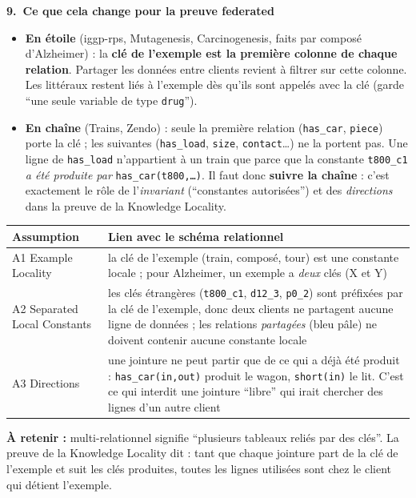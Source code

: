 \documentclass[10pt]{article}
\newcommand{\titrebox}[2]{\needspace{10\baselineskip}\vspace{8pt}
  \begin{tcolorbox}[colback=marine, colframe=marine, arc=0pt, boxrule=0pt,
    top=4pt, bottom=4pt, left=8pt]
  \color{white}\Large\bfseries #1.~#2
  \end{tcolorbox}\vspace{2pt}}
\newcommand{\ce}[1]{\begin{pourquoi}\textbf{\textcolor{marine}{À retenir :}} #1\end{pourquoi}}
\newcommand{\st}[1]{\par\needspace{7\baselineskip}\vspace{5pt}{\normalsize\bfseries\textcolor{marine}{#1}}\par\vspace{2pt}}
\begin{document}
\titrebox{9}{Ce que cela change pour la preuve federated}
\st{Deux formes de schéma : en étoile ou en chaîne}
\begin{itemize}
  \item \textbf{En étoile} (iggp-rps, Mutagenesis, Carcinogenesis, faits par composé d'Alzheimer) : la \textbf{clé de l'exemple est la première colonne de chaque relation}. Partager les données entre clients revient à filtrer sur cette colonne. Les littéraux restent liés à l'exemple dès qu'ils sont appelés avec la clé (garde ``une seule variable de type \texttt{drug}'').
  \item \textbf{En chaîne} (Trains, Zendo) : seule la première relation (\texttt{has\_car}, \texttt{piece}) porte la clé ; les suivantes (\texttt{has\_load}, \texttt{size}, \texttt{contact}\ldots) ne la portent pas. Une ligne de \texttt{has\_load} n'appartient à un train que parce que la constante \texttt{t800\_c1} \emph{a été produite par} \texttt{has\_car(t800,\ldots)}. Il faut donc \textbf{suivre la chaîne} : c'est exactement le rôle de l'\emph{invariant} (``constantes autorisées'') et des \emph{directions} dans la preuve de la Knowledge Locality.
\end{itemize}
\st{Où chaque hypothèse intervient}
\renewcommand{\arraystretch}{1.3}
\begin{tabular}{@{}L{3.2cm}L{13.2cm}@{}}
\textbf{Assumption} & \textbf{Lien avec le schéma relationnel}\\\hline
A1 Example Locality & la clé de l'exemple (train, composé, tour) est une constante locale ; pour Alzheimer, un exemple a \emph{deux} clés (X et Y)\\
A2 Separated Local Constants & les clés étrangères (\texttt{t800\_c1}, \texttt{d12\_3}, \texttt{p0\_2}) sont préfixées par la clé de l'exemple, donc deux clients ne partagent aucune ligne de données ; les relations \emph{partagées} (bleu pâle) ne doivent contenir aucune constante locale\\
A3 Directions & une jointure ne peut partir que de ce qui a déjà été produit : \texttt{has\_car(in,out)} produit le wagon, \texttt{short(in)} le lit. C'est ce qui interdit une jointure ``libre'' qui irait chercher des lignes d'un autre client\\
\end{tabular}
\ce{multi-relationnel signifie ``plusieurs tableaux reliés par des clés''. La preuve de la Knowledge Locality dit : tant que chaque jointure part de la clé de l'exemple et suit les clés produites, toutes les lignes utilisées sont chez le client qui détient l'exemple.}
\end{document}
